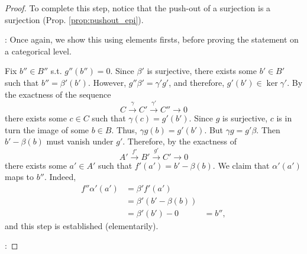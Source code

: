 \begin{proof}
To complete this step, notice that the push-out of a surjection
is a surjection (Prop. \ref{prop:pushout_epi}).

: Once again, we show this
using elements firsts, before proving the statement on a 
categorical level. 

Fix $b'' \in B''$ s.t. $g''(b'') = 0$. Since $\beta'$ is 
surjective, there exists some $b' \in B'$ such that $b'' = 
\beta'(b')$. However, $g''\beta' = \gamma' g'$, and 
therefore, $g'(b') \in \ker \gamma'$. By the exactness of
the sequence
\[
C \stackrel{\gamma}{\to} C' \stackrel{\gamma'}{\to} C'' \to 0
\]
there exists some $c \in C$ such that $\gamma(c) = g'(b')$.
Since $g$ is surjective, $c$ is in turn the image of some $b
\in B$. Thus, $\gamma g(b) = g'(b')$. But $\gamma g = g' \beta$.
Then $b' - \beta(b)$ must vanish under $g'$. Therefore, by the 
exactness of 
\[
A' \stackrel{f'}{\to} B' \stackrel{g'}{\to} C' \to 0
\]
there exists some $a' \in A'$ such that $f'(a') = b' - \beta(b)$.
We claim that $\alpha'(a')$ maps to $b''$. Indeed,
\begin{align*}
f'' \alpha'(a') &= \beta' f'(a') \\
                &= \beta'(b' - \beta(b)) \\
                &= \beta'(b') - 0
                &= b'',
\end{align*}
and this step is established (elementarily).

:
\end{proof}
